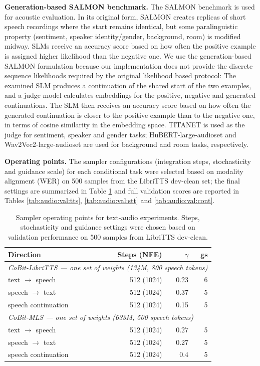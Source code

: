\textbf{Generation-based SALMON benchmark.} The SALMON benchmark is used for acoustic evaluation. In its original form, SALMON creates replicas of short speech recordings where the start remains identical, but some paralinguistic property (sentiment, speaker identity/gender, background, room) is modified midway. SLMs receive an accuracy score based on how often the positive example is assigned higher likelihood than the negative one. We use the generation-based SALMON formulation \citep{audio:gen-salmon} because our implementation does not provide the discrete sequence likelihoods required by the original likelihood based protocol: The examined SLM produces a continuation of the shared start of the two examples, and a judge model calculates embeddings for the positive, negative and generated continuations. The SLM then receives an accuracy score based on how often the generated continuation is closer to the positive example than to the negative one, in terms of cosine similarity in the embedding space. TITANET \citep{audio:titanet} is used as the judge for sentiment, speaker and gender tasks; HuBERT-large-audioset and Wav2Vec2-large-audioset \citep{audio:ARCH} are used for background and room tasks, respectively. 

\textbf{Operating points.} The sampler configurations (integration steps, stochasticity and guidance scale) for each conditional task were selected based on modality alignment (WER) on 500 samples from the LibriTTS dev-clean set; the final settings are summarized in Table \ref{tab:audio:operating-points} and full validation scores are reported in Tables \ref{tab:audio:val:tts}, \ref{tab:audio:val:stt} and \ref{tab:audio:val:cont}.

\begin{table}[t]
\centering
\small
\setlength{\tabcolsep}{4.5pt}
\begin{tabular}{lrrr}
\toprule
\textbf{Direction} & Steps (NFE) & $\gamma$ & gs \\
\midrule
\multicolumn{4}{l}{\emph{CoBit-LibriTTS --- one set of weights (134M, 800 speech tokens)}}\\
text $\rightarrow$ speech & 512 (1024) & 0.23 & 6 \\
speech $\rightarrow$ text & 512 (1024) & 0.37 & 5 \\
speech continuation & 512 (1024) & 0.15 & 5 \\
\midrule
\multicolumn{4}{l}{\emph{CoBit-MLS --- one set of weights (633M, 500 speech tokens)}}\\
text $\rightarrow$ speech & 512 (1024) & 0.27 & 5 \\
speech $\rightarrow$ text & 512 (1024) & 0.27 & 5 \\
speech continuation & 512 (1024) & 0.4 & 5 \\
\bottomrule
\end{tabular}
\caption{Sampler operating points for text-audio experiments. Steps, stochasticity and guidance settings were chosen based on validation performance on 500 samples from LibriTTS dev-clean.}
\label{tab:audio:operating-points}
\end{table}

